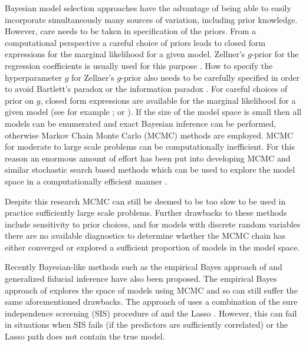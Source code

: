 \documentclass[11pt]{article}
\newtheorem{Main Result}{Main Result}
\newcommand{\joc}[1]{{\color{black}#1}}
\begin{document}
Bayesian model selection approaches have the advantage of being able to easily
incorporate simultaneously many sources of variation, including prior knowledge.
\joc{
However, care needs to be taken in specification of the priors. From a computational
perspective a careful choice of priors leads to closed form expressions for the marginal
likelihood for a given model. Zellner's $g$-prior for the regression coefficients is usually
used for this purpose \citep{Zellner1986}. How to specify the hyperparameter $g$ 
for Zellner's $g$-prior also needs to be carefully specified in order to avoid Bartlett's 
paradox \citep{Bartlett1957} 
or the information paradox \citep{Liang2008}.
For careful choices of prior on $g$, closed form expressions are available for the 
marginal likelihood for a given model (see for example \citealp{Liang2008}; or 
\citealp{Maruyama2011}). If the size of the model space is small then all models
can be enumerated and exact Bayesian inference can be performed, otherwise 
Markov \joc{C}hain Monte Carlo (MCMC) methods are employed. MCMC} for moderate to large
scale problems   \joc{can be computationally} inefficient. For this reason an enormous 
amount of effort has been put into developing MCMC and similar stochastic search based 
methods which can be used to explore the model space \joc{in a computationally efficient 
manner} \citep{Nott2005,Hans2007,OHara2009,Bottolo2010,Li2010,Stingo2011}. 

Despite this research MCMC can still be deemed to be too slow to be used in practice
sufficiently large scale problems. Further drawbacks to these methods include sensitivity 
to prior choices, and \joc{for models with discrete random variables} there are no 
available diagnostics to determine whether the MCMC chain has either converged or explored 
a sufficient proportion of models in the model space.

\joc{
Recently Bayesian-like methods such as the empirical Bayes approach of 
\cite{MartinEtal2014}
and generalized fiducial inference \cite{LaiEtal2015} have also been proposed.
The empirical Bayes approach of \cite{MartinEtal2014} explores the space of models using MCMC 
and so can still suffer the same aforementioned drawbacks. The approach of \cite{LaiEtal2015} uses a combination of the sure independence screening (SIS) procedure of \cite{FanLv2008} and the Lasso \citep{Tibshirani1996}. However, this 
can fail in situations when  SIS fails (if the predictors are sufficiently correlated) or 
the Lasso path does not contain the true model.
}
\end{document}
